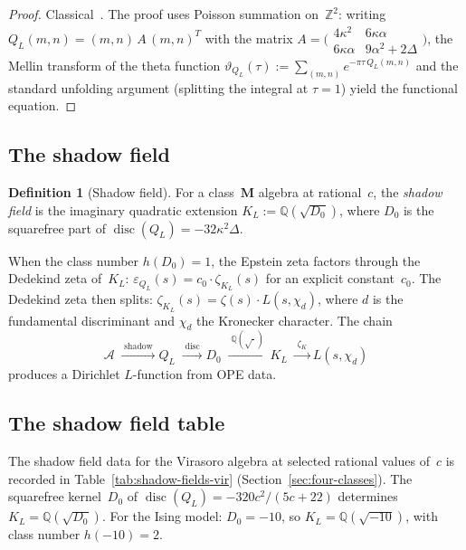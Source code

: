 \documentclass[11pt,reqno]{amsart}
\theoremstyle{definition}
\newtheorem{definition}[theorem]{Definition}
\theoremstyle{remark}
\newcommand{\cA}{\mathcal{A}}
\numberwithin{equation}{section}
\begin{document}
\begin{proof}
Classical~\cite{Epstein1903, Terras73}. The proof uses
Poisson summation on~$\mathbb{Z}^2$: writing
$Q_L(m,n) = (m,n)\,A\,(m,n)^T$ with the matrix
$A = \bigl(\begin{smallmatrix}
 4\kappa^2 & 6\kappa\alpha \\
 6\kappa\alpha & 9\alpha^2 + 2\Delta
\end{smallmatrix}\bigr)$,
the Mellin transform of the theta function
$\vartheta_{Q_L}(\tau) :=
\sum_{(m,n)} e^{-\pi\tau\,Q_L(m,n)}$
and the standard unfolding argument (splitting the integral
at $\tau = 1$) yield the functional equation.
\end{proof}

\subsection{The shadow field}

\begin{definition}[Shadow field]
\label{def:shadow-field}
For a class~$\mathbf{M}$ algebra at rational~$c$, the
\emph{shadow field} is the imaginary quadratic extension
$K_L := \mathbb{Q}(\sqrt{D_0})$,
where $D_0$ is the squarefree part of
$\operatorname{disc}(Q_L) = -32\kappa^2\Delta$.
\end{definition}

When the class number $h(D_0) = 1$, the Epstein zeta factors
through the Dedekind zeta of~$K_L$:
$\varepsilon_{Q_L}(s) = c_0 \cdot \zeta_{K_L}(s)$
for an explicit constant~$c_0$. The Dedekind zeta then splits:
$\zeta_{K_L}(s) = \zeta(s) \cdot L(s, \chi_d)$,
where $d$ is the fundamental discriminant and $\chi_d$ the
Kronecker character. The chain
\[
 \cA
 \;\xrightarrow{\;\text{shadow}\;}
 Q_L
 \;\xrightarrow{\;\operatorname{disc}\;}
 D_0
 \;\xrightarrow{\;\mathbb{Q}(\sqrt{\cdot})\;}
 K_L
 \;\xrightarrow{\;\zeta_K\;}
 L(s, \chi_d)
\]
produces a Dirichlet $L$-function from OPE data.

\subsection{The shadow field table}

The shadow field data for the Virasoro algebra at selected
rational values of~$c$ is recorded in
Table~\ref{tab:shadow-fields-vir}
(Section~\ref{sec:four-classes}). The squarefree kernel~$D_0$
of $\operatorname{disc}(Q_L) = -320c^2/(5c+22)$ determines
$K_L = \mathbb{Q}(\sqrt{D_0})$. For the Ising model:
$D_0 = -10$, so $K_L = \mathbb{Q}(\sqrt{-10})$, with
class number $h(-10) = 2$.
\end{document}
